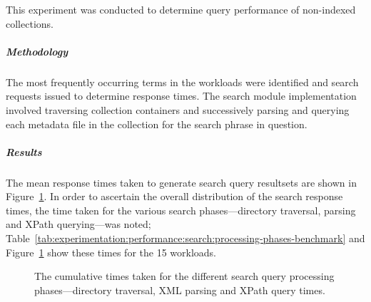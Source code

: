 This experiment was conducted to determine query performance of non-indexed collections.

\subparagraph{Methodology}

The most frequently occurring terms in the workloads were identified and search requests issued to determine response times. The search module implementation involved traversing collection containers and successively parsing and querying each metadata file in the collection for the search phrase in question.

\subparagraph{Results}

The mean response times taken to generate search query resultsets are shown in Figure~\ref{fig:experimentation:performance:search:processing-phases-cumulative}. In order to ascertain the overall distribution of the search response times, the time taken for the various search phases---directory traversal, parsing and XPath querying---was noted; Table~\ref{tab:experimentation:performance:search:processing-phases-benchmark} and Figure~\ref{fig:experimentation:performance:search:processing-phases-cumulative} show these times for the \num{15} workloads.

\tablespacing

\bodyspacing

\begin{figure}
 \centering
 \framebox[\textwidth]{%

 }
 \caption[Baseline performance benchmarks for full-text search]{The cumulative times taken for the different search query processing phases---directory traversal, XML parsing and XPath query times.}
 \label{fig:experimentation:performance:search:processing-phases-cumulative}
\end{figure}


%

